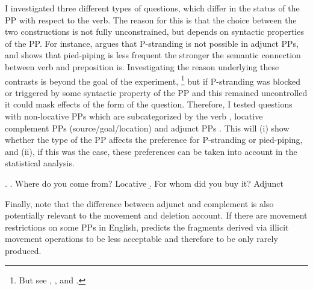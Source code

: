 I investigated three different types of questions, which differ in the status of the PP with respect to the verb. The reason for this is that the choice between the two constructions is not fully unconstrained, but depends on syntactic properties of the PP. For instance, \citet[26]{vanriemsdijk1978} argues that P-stranding is not possible in adjunct PPs, and \citet{nykiel2017} shows that pied-piping is less frequent the stronger the semantic connection between verb and preposition is. Investigating the reason underlying these contrasts is beyond the goal of the experiment,%
% 
\footnote{But see \citet{vanriemsdijk1978}, \citet{chomsky1981}, \citet{pullum.huddleston2002} and \citet{nykiel2017}.}\afterfn%
%
but if P-stranding was blocked or triggered by some syntactic property of the PP and this remained uncontrolled it could mask effects of the form of the question. Therefore, I tested questions with non-locative PPs which are subcategorized by the verb \LLast, locative complement PPs (source\slash goal\slash location) \Next[a] and adjunct PPs \Next[b]. This will (i) show whether the type of the PP affects the preference for P-stranding or pied-piping, and (ii), if this was the case, these preferences can be taken into account in the statistical analysis.

\ex. \a. Where do you come from? \hfill Locative
     \b. For whom did you buy it? \hfill Adjunct

Finally, note that the difference between adjunct and complement is also potentially relevant to the movement and deletion account. If there are movement restrictions on some PPs in English, \citet{merchant2004} predicts the fragments derived via illicit movement operations to be less acceptable and therefore to be only rarely produced.

